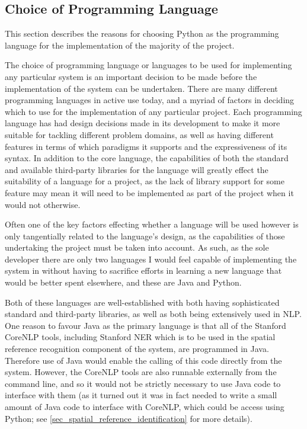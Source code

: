 \documentclass[12pt, a4paper]{report}
\begin{document}
\subsection{Choice of Programming Language}

This section describes the reasons for choosing Python as the programming language for the implementation of the majority of the project.

The choice of programming language or languages to be used for implementing any particular system is an important decision to be made before the implementation of the system can be undertaken. There are many different programming languages in active use today, and a myriad of factors in deciding which to use for the implementation of any particular project. Each programming language has had design decisions made in its development to make it more suitable for tackling different problem domains, as well as having different features in terms of which paradigms it supports and the expressiveness of its syntax. In addition to the core language, the capabilities of both the standard and available third-party libraries for the language will greatly effect the suitability of a language for a project, as the lack of library support for some feature may mean it will need to be implemented as part of the project when it would not otherwise.

Often one of the key factors effecting whether a language will be used however is only tangentially related to the language's design, as the capabilities of those undertaking the project must be taken into account. As such, as the sole developer there are only two languages I would feel capable of implementing the system in without having to sacrifice efforts in learning a new language that would be better spent elsewhere, and these are Java and Python.

Both of these languages are well-established with both having sophisticated standard and third-party libraries, as well as both being extensively used in NLP. One reason to favour Java as the primary language is that all of the Stanford CoreNLP tools, including Stanford NER which is to be used in the spatial reference recognition component of the system, are programmed in Java. Therefore use of Java would enable the calling of this code directly from the system. However, the CoreNLP tools are also runnable externally from the command line, and so it would not be strictly necessary to use Java code to interface with them (as it turned out it was in fact needed to write a small amount of Java code to interface with CoreNLP, which could be access using Python; see \ref{sec_spatial_reference_identification} for more details).
\end{document}
